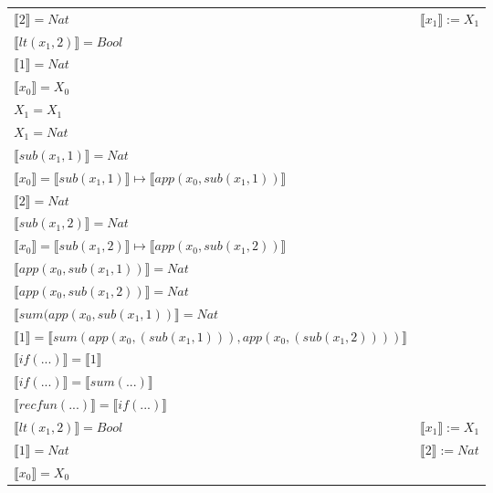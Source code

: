 \begin{exercise}
\begin{description}
\begin{center}
\begin{longtable}[!h]{ | l | l | }
                      \hline
                        $ \llbracket 2 \rrbracket = Nat$  & $ \llbracket x_1 \rrbracket := X_1$ \\
                        $ \llbracket lt(x_1 , 2) \rrbracket = Bool$ & \\
                        $ \llbracket 1 \rrbracket = Nat$ & \\
                        $ \llbracket x_0 \rrbracket = X_0$ & \\
                        $X_1 = X_1$ & \\
                        $X_1 = Nat$ & \\
                        $ \llbracket sub(x_1,1) \rrbracket = Nat$ & \\
                        $ \llbracket x_0 \rrbracket =  \llbracket sub(x_1,1) \rrbracket \mapsto  \llbracket app(x_0, sub(x_1,1)) \rrbracket$ & \\
                        $ \llbracket 2 \rrbracket = Nat$ & \\
                        $ \llbracket sub(x_1,2) \rrbracket = Nat$ & \\
                        $ \llbracket x_0 \rrbracket =  \llbracket sub(x_1,2) \rrbracket \mapsto  \llbracket app(x_0, sub(x_1,2)) \rrbracket$ & \\
                        $ \llbracket app(x_0, sub(x_1,1)) \rrbracket = Nat$ & \\
                        $ \llbracket app(x_0, sub(x_1,2)) \rrbracket = Nat$ & \\
                        $ \llbracket sum(app(x_0, sub(x_1,1)) \rrbracket = Nat$ & \\
                        $ \llbracket 1 \rrbracket =  \llbracket sum(app(x_0, (sub(x_1,1))), app(x_0, (sub(x_1,2)))) \rrbracket$ & \\
                        $ \llbracket if(...) \rrbracket =  \llbracket 1 \rrbracket$ & \\
                        $ \llbracket if(...) \rrbracket =  \llbracket sum(...) \rrbracket$ & \\
                        $ \llbracket recfun(...) \rrbracket =  \llbracket if(...) \rrbracket$ & \\
                    \hline
                        $ \llbracket lt(x_1 , 2) \rrbracket = Bool$ & $ \llbracket x_1 \rrbracket := X_1$\\
                        $ \llbracket 1 \rrbracket = Nat$ & $ \llbracket 2 \rrbracket := Nat$\\
                        $ \llbracket x_0 \rrbracket = X_0$ & \\

\end{longtable}
\end{center}
\end{description}
\end{exercise}
